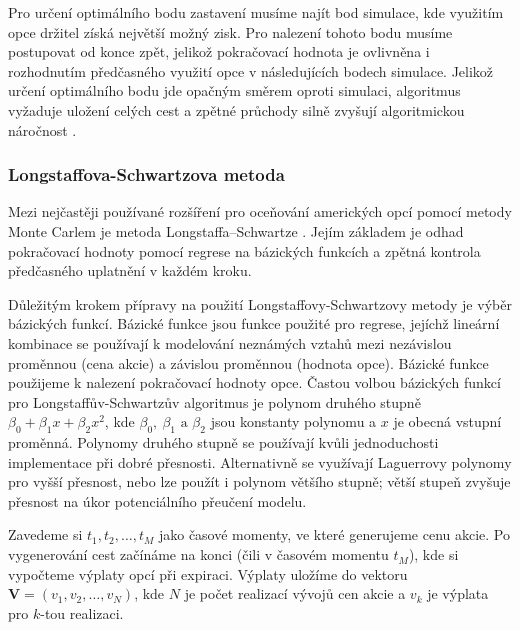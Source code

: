 \documentclass[male,czech,api_bc]{kitheses}
\begin{document}
  Pro určení optimálního bodu zastavení musíme najít bod simulace, kde využitím opce držitel získá největší možný zisk. Pro nalezení tohoto bodu musíme postupovat od konce zpět, jelikož pokračovací hodnota je ovlivněna i rozhodnutím předčasného využití opce v následujících bodech simulace. Jelikož určení optimálního bodu jde opačným směrem oproti simulaci, algoritmus vyžaduje uložení celých cest a zpětné průchody silně zvyšují algoritmickou náročnost \parencites[kapitola~24.6]{McDonald2013}.

  \subsubsection{Longstaffova-Schwartzova metoda}

  \label{sec:mc_ls}
    Mezi nejčastěji používané rozšíření pro oceňování amerických opcí pomocí metody Monte Carlem je metoda Longstaffa–Schwartze \parencites{LongstaffSchwartz2001}. Jejím základem je odhad pokračovací hodnoty pomocí regrese na bázických funkcích a zpětná kontrola předčasného uplatnění v každém kroku.

    Důležitým krokem přípravy na použití Longstaffovy-Schwartzovy metody je výběr bázických funkcí. Bázické funkce jsou funkce použité pro regrese, jejíchž lineární kombinace se používají k modelování neznámých vztahů mezi nezávislou proměnnou (cena akcie) a závislou proměnnou (hodnota opce). Bázické funkce použijeme k nalezení pokračovací hodnoty opce. Častou volbou bázických funkcí pro Longstaffův-Schwartzův algoritmus je polynom druhého stupně $\beta_0 + \beta_1 x + \beta_2 x^2$, kde $\beta_0,\ \beta_1\text{ a }\beta_2$ jsou konstanty polynomu a $x$ je obecná vstupní proměnná. Polynomy druhého stupně se používají kvůli jednoduchosti implementace při dobré přesnosti. Alternativně se využívají Laguerrovy polynomy pro vyšší přesnost, nebo lze použít i polynom většího stupně; větší stupeň zvyšuje přesnost na úkor potenciálního přeučení modelu.
  \parencites{LongstaffSchwartz2001}[kapitola~8.4]{Glasserman2004}

    Zavedeme si $t_1, t_2, \dots, t_M$ jako časové momenty, ve které generujeme cenu akcie. Po vygenerování cest začínáme na konci (čili v časovém momentu $t_M$), kde si vypočteme výplaty opcí při expiraci. Výplaty uložíme do vektoru $\textbf{V} = (v_1, v_2, \dots, v_N)$, kde $N$ je počet realizací vývojů cen akcie a $v_k$ je výplata pro $k$-tou realizaci.
\end{document}

